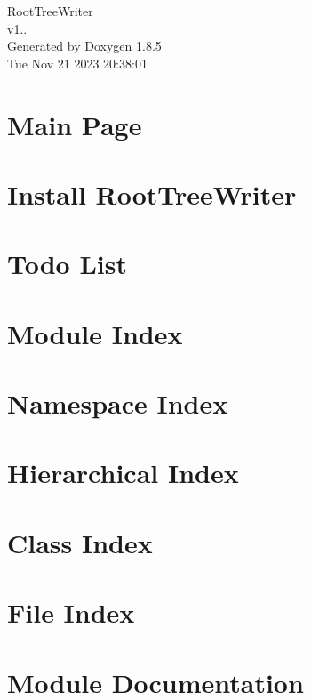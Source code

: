 \documentclass[twoside]{book}
\newcommand{\clearemptydoublepage}{%
  \newpage{\pagestyle{empty}\cleardoublepage}%
}
\begin{document}
\begin{titlepage}
\vspace*{7cm}
\begin{center}%
{\Large Root\-Tree\-Writer \\[1ex]\large v1.. }\\
\vspace*{1cm}
{\large Generated by Doxygen 1.8.5}\\
\vspace*{0.5cm}
{\small Tue Nov 21 2023 20:38:01}\\
\end{center}
\end{titlepage}
\clearemptydoublepage
\tableofcontents
\clearemptydoublepage
{}

\chapter{Main Page}
\label{index}
\chapter{Install Root\-Tree\-Writer}
\label{general_install}

\chapter{Todo List}
\label{todo}

\chapter{Module Index}

\chapter{Namespace Index}

\chapter{Hierarchical Index}

\chapter{Class Index}

\chapter{File Index}

\chapter{Module Documentation}

\end{document}
